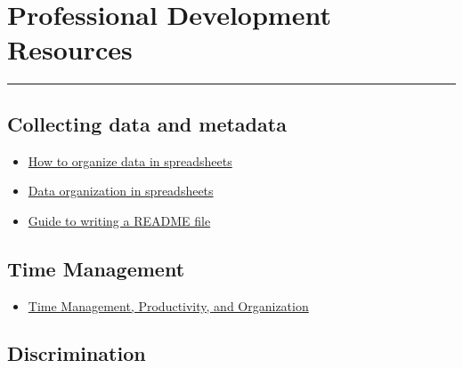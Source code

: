 \documentclass[
  letterpaper,
  DIV=11,
  numbers=noendperiod]{scrreprt}
\providecommand{\tightlist}{%
  \setlength{\itemsep}{0pt}\setlength{\parskip}{0pt}}\usepackage{longtable,booktabs,array}
\begin{document}
\hypertarget{professional-development-resources}{%
\chapter{Professional Development
Resources}\label{professional-development-resources}}

\begin{center}\rule{0.5\linewidth}{0.5pt}\end{center}

\hypertarget{collecting-data-and-metadata}{%
\section*{\texorpdfstring{\textbf{Collecting data and
metadata}}{Collecting data and metadata}}\label{collecting-data-and-metadata}}


\begin{itemize}
\item
  \href{https://datacarpentry.org/spreadsheet-ecology-lesson/02-common-mistakes/index.html}{How
  to organize data in spreadsheets}
\item
  \href{https://www.tandfonline.com/doi/full/10.1080/00031305.2017.1375989}{Data
  organization in spreadsheets}
\item
  \href{https://data.research.cornell.edu/content/readme}{Guide to
  writing a README file}
\end{itemize}

\hypertarget{time-management}{%
\section*{\texorpdfstring{\textbf{Time
Management}}{Time Management}}\label{time-management}}


\begin{itemize}
\tightlist
\item
  \href{https://docs.google.com/document/d/13xiuKlbF0ao1CSZoeDg5RmtGibtNRclVZeQpAYcLIFo/edit}{Time
  Management, Productivity, and Organization}
\end{itemize}

\hypertarget{discrimination}{%
\section*{\texorpdfstring{\textbf{Discrimination}}{Discrimination}}\label{discrimination}}
\end{document}
